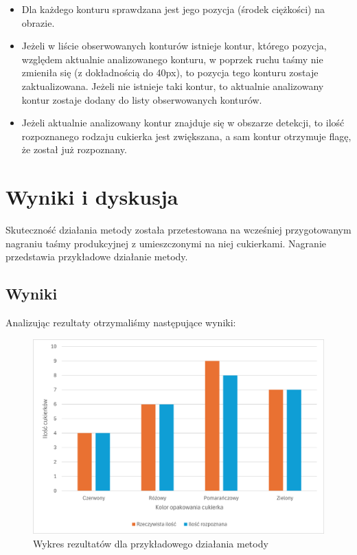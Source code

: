 \documentclass{article}
\begin{document}
\begin{enumerate}
\begin{itemize}
        \item Dla każdego konturu sprawdzana jest jego pozycja (środek ciężkości) na obrazie.
        \item Jeżeli w liście obserwowanych konturów istnieje kontur, którego pozycja, względem aktualnie analizowanego konturu, w poprzek ruchu taśmy nie zmieniła się (z dokładnością do 40px), to pozycja tego konturu zostaje zaktualizowana. Jeżeli nie istnieje taki kontur, to aktualnie analizowany kontur zostaje dodany do listy obserwowanych konturów.
        \item Jeżeli aktualnie analizowany kontur znajduje się w obszarze detekcji, to ilość rozpoznanego rodzaju cukierka jest zwiększana, a sam kontur otrzymuje flagę, że został już rozpoznany.
    \end{itemize}
\end{enumerate}

\section{Wyniki i dyskusja}
\label{Wyniki i dyskusja}
Skuteczność działania metody została przetestowana na wcześniej przygotowanym nagraniu taśmy produkcyjnej z umieszczonymi na niej cukierkami. Nagranie przedstawia przykładowe działanie metody.
\subsection{Wyniki}
Analizując rezultaty otrzymaliśmy następujące wyniki:

\begin{figure}[H]
    \centering
    \includegraphics[width=\linewidth]{wykresSkutecznosci}
    \caption{Wykres rezultatów dla przykładowego działania metody}
    \label{fig:wykresSkutecznosci}
\end{figure}
\end{document}
